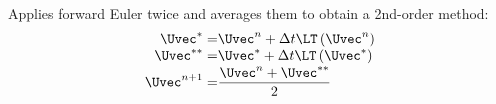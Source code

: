 \begin{defnbox}\nospacing
    \begin{defn}\label{defn:heuns_method}\leavevmode\\
        Applies forward Euler twice and averages them to obtain a 2nd-order method:
        \begin{align}
          \Uvec^{*}=&\Uvec^{n}+\Delta t\LT \left(\Uvec^{n}\right)\\[-1\jot]
          \Uvec^{**}=&\Uvec^{*}+\Delta t\LT \left(\Uvec^{*}\right)\\[-1\jot]
          \Uvec^{n+1}=&\frac{\Uvec^{n}+\Uvec^{**}}{2}
        \end{align}
    \end{defn}
\end{defnbox}
